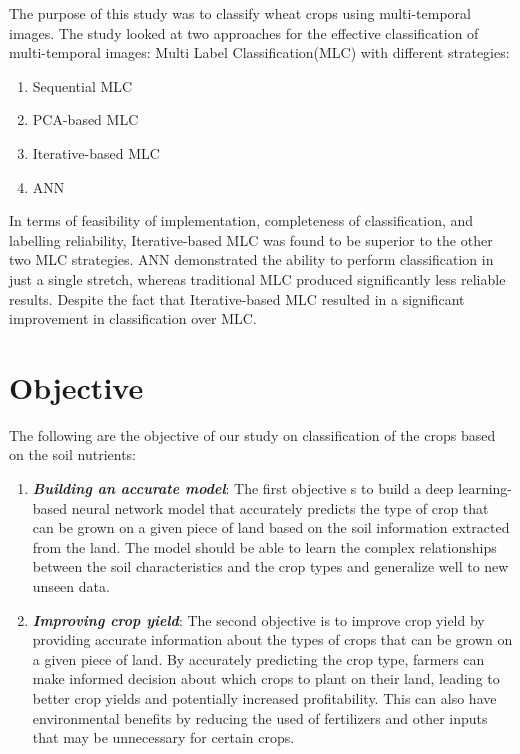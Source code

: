 \documentclass[conference]{IEEEtran}
\begin{document}
The purpose of this \cite{b5} study was to classify wheat crops using multi-temporal images. The study looked at two approaches for the effective classification of multi-temporal images: Multi Label Classification(MLC) with different strategies:
\begin{enumerate}
    \item Sequential MLC
    \item PCA-based MLC
    \item Iterative-based MLC
    \item ANN
\end{enumerate}
In terms of feasibility of implementation, completeness of classification, and labelling reliability, Iterative-based MLC was found to be superior to the other two MLC strategies. ANN demonstrated the ability to perform classification in just a single stretch, whereas traditional MLC produced significantly less reliable results. Despite the fact that Iterative-based MLC resulted in a significant improvement in classification over MLC.

\section{Objective}
The following are the objective of our study on classification of the crops based on the soil nutrients:

\begin{enumerate}
    \item \emph{\textbf{Building an accurate model}}: The first objective s to build a deep learning-based neural network model that accurately predicts the type of crop that can be grown on a given piece of land based on the soil information extracted from the land. The model should be able to learn the complex relationships between the soil characteristics and the crop types and generalize well to new unseen data.

    \item \emph{\textbf{Improving crop yield}}: The second objective is to improve crop yield by providing accurate information about the types of crops that can be grown on a given piece of land. By accurately predicting the crop type, farmers can make informed decision about which crops to plant on their land, leading to better crop yields and potentially increased profitability. This can also have environmental benefits by reducing the used of fertilizers and other inputs that may be unnecessary for certain crops.
\end{enumerate}
\end{document}
